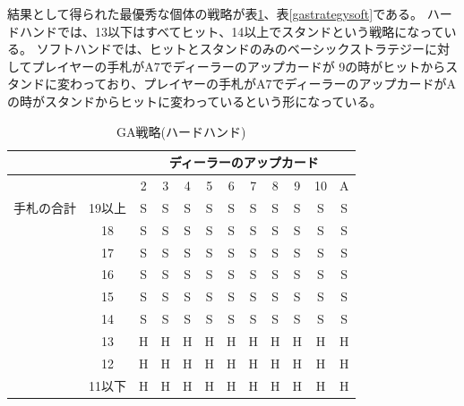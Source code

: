結果として得られた最優秀な個体の戦略が表\ref{gastrategyhard}、表\ref{gastrategysoft}である。
ハードハンドでは、13以下はすべてヒット、14以上でスタンドという戦略になっている。
ソフトハンドでは、ヒットとスタンドのみのベーシックストラテジーに対してプレイヤーの手札がA7でディーラーのアップカードが
9の時がヒットからスタンドに変わっており、プレイヤーの手札がA7でディーラーのアップカードがAの時がスタンドからヒットに変わっているという形になっている。

  \begin{table}[htbp]
    \centering
    \caption{GA戦略(ハードハンド)\label{gastrategyhard}}
    \begin{tabular}{|c|c|c|c|c|c|c|c|c|c|c|c|}
      \hline
      \multicolumn{2}{|c|}{} & \multicolumn{10}{|c|}{ディーラーのアップカード} \\ \hline
      \multicolumn{2}{|c|}{} & 2 & 3 & 4 & 5 & 6 & 7 & 8 & 9 & 10 & A \\ \hline
      手札の合計 & 19以上 & S & S & S & S & S & S & S & S & S & S \\ \cline{3-12}
                & 18 & S & S & S & S & S & S & S & S & S & S \\ \cline{3-12}
                & 17 & S & S & S & S & S & S & S & S & S & S \\ \cline{3-12}
                & 16 & S & S & S & S & S & S & S & S & S & S \\ \cline{3-12}
                & 15 & S & S & S & S & S & S & S & S & S & S \\ \cline{3-12}
                & 14 & S & S & S & S & S & S & S & S & S & S \\ \cline{3-12}
                & 13 & H & H & H & H & H & H & H & H & H & H \\ \cline{3-12}
                & 12 & H & H & H & H & H & H & H & H & H & H \\ \cline{3-12}
                & 11以下 & H & H & H & H & H & H & H & H & H & H \\ \hline
    \end{tabular}
  \end{table}

